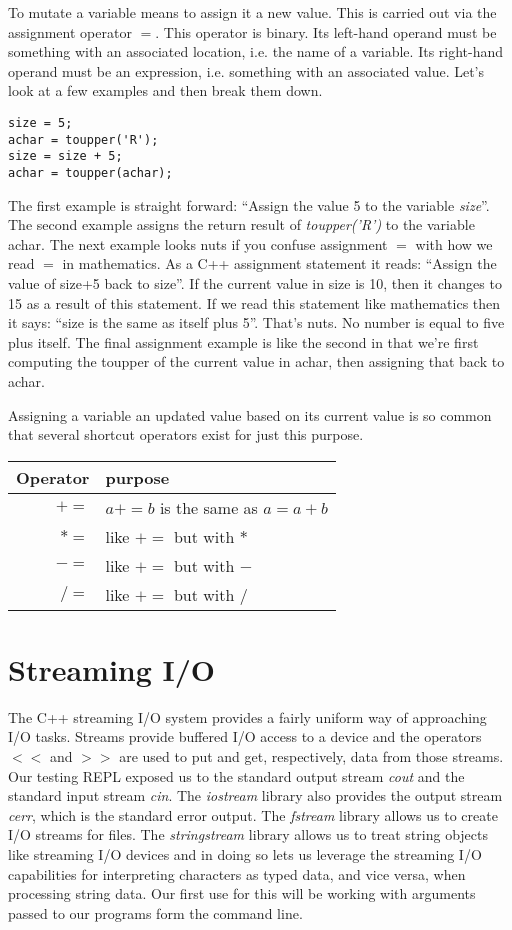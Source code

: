 \documentclass[]{tufte-handout}
\begin{document}
To mutate a variable means to assign it a new value. This is carried out via the assignment operator $=$. This operator is binary. Its left-hand operand must be something with an associated location, i.e. the name of a variable. Its  right-hand operand must be an expression, i.e. something with an associated value. Let's look at a few examples and then break them down.
\begin{verbatim}
size = 5;
achar = toupper('R');
size = size + 5;
achar = toupper(achar);
\end{verbatim}

The first example is straight forward: ``Assign the value 5 to the variable \textit{size}''.  The second example assigns the return result of \textit{toupper('R')} to the variable achar. The next example looks nuts if you confuse assignment $=$ with how we read $=$ in mathematics. As a C++ assignment statement it reads: ``Assign the value of size+5 back to size''.  If the current value in size is 10, then it changes to 15 as a result of this statement.  If we read this statement like mathematics then it says: ``size is the same as itself plus 5''. That's nuts. No number is equal to five plus itself.  The final assignment example is like the second in that we're first computing the toupper of the current value in achar, then assigning that back to achar.

Assigning a variable an updated value based on its current value is so common that several shortcut operators exist for just this purpose.
\begin{center}
\begin{tabular}{rl}
Operator & purpose \\ \hline
$+=$ & $a+=b$ is the same as $a = a + b$ \\
$*=$ & like $+=$ but with $*$ \\
$-=$ & like $+=$ but with $-$ \\
$/=$ & like $+=$ but with $/$ 
\end{tabular}
\end{center}

\section{Streaming I/O}

The C++ streaming I/O system provides a fairly uniform way of approaching I/O tasks. Streams provide buffered I/O access to a device and the operators $<<$ and $>>$ are used to put and get, respectively, data from those streams. Our testing REPL exposed us to the standard output stream \textit{cout} and the standard input stream \textit{cin}. The \textit{iostream} library also provides the output stream \textit{cerr}, which is the standard error output. The \textit{fstream} library allows us to create I/O streams for files. The \textit{stringstream} library allows us to treat string objects like streaming I/O devices and in doing so lets us leverage the streaming I/O capabilities for interpreting characters as typed data, and vice versa, when processing string data. Our first use for this will be working with arguments passed to our programs form the command line.
\end{document}
